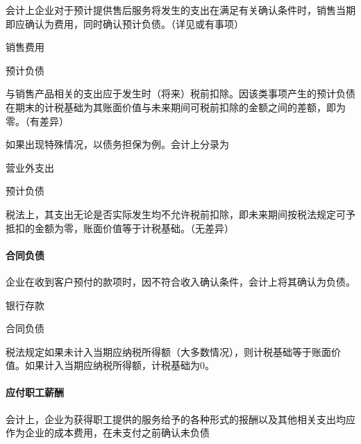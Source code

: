 \documentclass[UTF8,12pt]{ctexart}
\newenvironment{Dr}{%
	\begin{list}{}%
		{
			\setlength{\leftmargin}{2em}
			\setlength{\labelwidth}{2em}
			\setlength{\labelsep}{0pt}
			\setlength{\itemindent}{0pt}
			\setlength{\listparindent}{0pt}
			\setlength{\parsep}{0pt}
			\setlength{\topsep}{0pt}
		}
		\item[\textbf{借：}]
	}{%
	\end{list}
}
\newenvironment{Cr}{%
	\begin{list}{}%
		{
			\setlength{\leftmargin}{3em}
			\setlength{\labelwidth}{2em}
			\setlength{\labelsep}{0pt}
			\setlength{\itemindent}{0pt}
			\setlength{\listparindent}{0pt}
			\setlength{\parsep}{0pt}
			\setlength{\topsep}{0pt}
		}
		\item[\textbf{贷：}]
	}{%
	\end{list}
}
\numberwithin{equation}{section} %
\numberwithin{figure}{section}
\numberwithin{table}{section}
\begin{document}
	会计上企业对于预计提供售后服务将发生的支出在满足有关确认条件时，销售当期即应确认为费用，同时确认预计负债。（详见或有事项）
	\begin{Dr}
		销售费用
	\end{Dr}
	\begin{Cr}
		预计负债
	\end{Cr}
	
	与销售产品相关的支出应于发生时（将来）税前扣除。因该类事项产生的预计负债在期末的计税基础为其账面价值与未来期间可税前扣除的金额之间的差额，即为零。（有差异）
	
	如果出现特殊情况，以债务担保为例。会计上分录为
	\begin{Dr}
		营业外支出
	\end{Dr}
	\begin{Cr}
		预计负债
	\end{Cr}
	
	税法上，其支出无论是否实际发生均不允许税前扣除，即未来期间按税法规定可予抵扣的金额为零，账面价值等于计税基础。（无差异）
	
	\paragraph{合同负债}
	企业在收到客户预付的款项时，因不符合收入确认条件，会计上将其确认为负债。
	\begin{Dr}
		银行存款
	\end{Dr}
	\begin{Cr}
		合同负债
	\end{Cr}
	
	税法规定如果未计入当期应纳税所得额（大多数情况），则计税基础等于账面价值。如果计入当期应纳税所得额，计税基础为0。
	
	\paragraph{应付职工薪酬}
	会计上，企业为获得职工提供的服务给予的各种形式的报酬以及其他相关支出均应作为企业的成本费用，在未支付之前确认未负债
	
\end{document}
